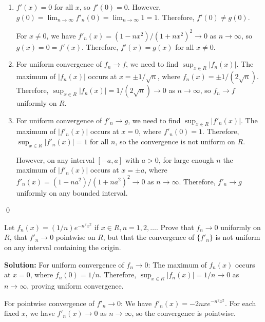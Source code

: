 \begin{enumerate}[label=(\alph*)]
\item \( f'(x) = 0 \) for all \( x \), so \( f'(0) = 0 \). However, \( g(0) = \lim_{n \to \infty} f'_n(0) = \lim_{n \to \infty} 1 = 1 \). Therefore, \( f'(0) \neq g(0) \).

For \( x \neq 0 \), we have \( f'_n(x) = (1 - nx^2)/(1 + nx^2)^2 \to 0 \) as \( n \to \infty \), so \( g(x) = 0 = f'(x) \). Therefore, \( f'(x) = g(x) \) for all \( x \neq 0 \).

\item For uniform convergence of \( f_n \to f \), we need to find \( \sup_{x \in R} |f_n(x)| \). The maximum of \( |f_n(x)| \) occurs at \( x = \pm 1/\sqrt{n} \), where \( f_n(x) = \pm 1/(2\sqrt{n}) \). Therefore, \( \sup_{x \in R} |f_n(x)| = 1/(2\sqrt{n}) \to 0 \) as \( n \to \infty \), so \( f_n \to f \) uniformly on \( R \).

\item For uniform convergence of \( f'_n \to g \), we need to find \( \sup_{x \in R} |f'_n(x)| \). The maximum of \( |f'_n(x)| \) occurs at \( x = 0 \), where \( f'_n(0) = 1 \). Therefore, \( \sup_{x \in R} |f'_n(x)| = 1 \) for all \( n \), so the convergence is not uniform on \( R \).

However, on any interval \([-a, a]\) with \( a > 0 \), for large enough \( n \) the maximum of \( |f'_n(x)| \) occurs at \( x = \pm a \), where \( f'_n(x) = (1 - na^2)/(1 + na^2)^2 \to 0 \) as \( n \to \infty \). Therefore, \( f'_n \to g \) uniformly on any bounded interval.
\end{enumerate}\qed


\begin{problembox}
Let \( f_n(x) = (1/n)e^{-n^2x^2} \) if \( x \in R, n = 1, 2, \ldots \). Prove that \( f_n \to 0 \) uniformly on \( R \), that \( f'_n \to 0 \) pointwise on \( R \), but that the convergence of \(\{f'_n\}\) is not uniform on any interval containing the origin.
\end{problembox}

\noindent\textbf{Solution:} For uniform convergence of \( f_n \to 0 \): The maximum of \( f_n(x) \) occurs at \( x = 0 \), where \( f_n(0) = 1/n \). Therefore, \( \sup_{x \in R} |f_n(x)| = 1/n \to 0 \) as \( n \to \infty \), proving uniform convergence.

For pointwise convergence of \( f'_n \to 0 \): We have \( f'_n(x) = -2nxe^{-n^2x^2} \). For each fixed \( x \), we have \( f'_n(x) \to 0 \) as \( n \to \infty \), so the convergence is pointwise.

